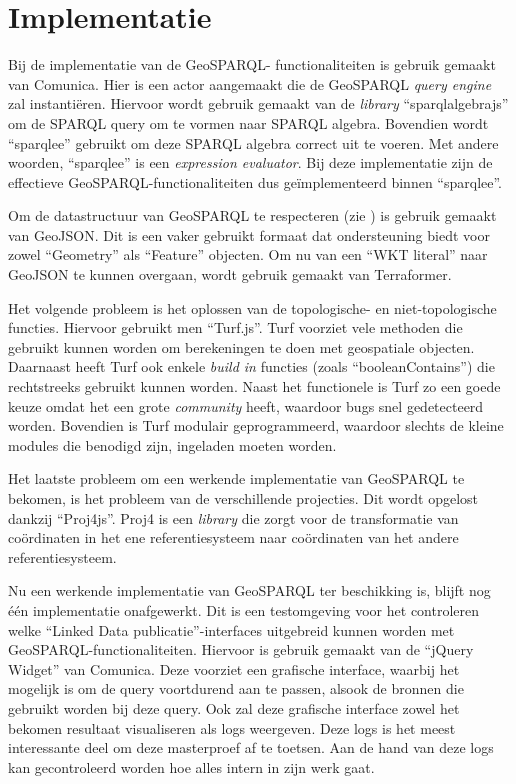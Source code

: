 \documentclass[twocolumn]{phdsymp} %
\begin{document}
\section{Implementatie}
Bij de implementatie van de GeoSPARQL- functionaliteiten is gebruik gemaakt van Comunica. Hier is een actor aangemaakt die de GeoSPARQL \textit{query engine} zal instantiëren. Hiervoor wordt gebruik gemaakt van de \textit{library} ``sparqlalgebrajs'' om de SPARQL query om te vormen naar SPARQL algebra. Bovendien wordt ``sparqlee'' gebruikt om deze SPARQL algebra correct uit te voeren. Met andere woorden, ``sparqlee'' is een \textit{expression evaluator}. Bij deze implementatie zijn de effectieve GeoSPARQL-functionaliteiten dus geïmplementeerd binnen ``sparqlee''. 

Om de datastructuur van GeoSPARQL te respecteren (zie ) is gebruik gemaakt van GeoJSON. Dit is een vaker gebruikt formaat dat ondersteuning biedt voor zowel ``Geometry'' als ``Feature'' objecten. Om nu van een ``WKT literal'' naar GeoJSON te kunnen overgaan, wordt gebruik gemaakt van Terraformer. 

Het volgende probleem is het oplossen van de topologische- en niet-topologische functies. Hiervoor gebruikt men ``Turf.js''. Turf voorziet vele methoden die gebruikt kunnen worden om berekeningen te doen met geospatiale objecten. Daarnaast heeft Turf ook enkele \textit{build in} functies (zoals ``booleanContains'') die rechtstreeks gebruikt kunnen worden. Naast het functionele is Turf zo een goede keuze omdat het een grote \textit{community} heeft, waardoor bugs snel gedetecteerd worden. Bovendien is Turf modulair geprogrammeerd, waardoor slechts de kleine modules die benodigd zijn, ingeladen moeten worden. 

Het laatste probleem om een werkende implementatie van GeoSPARQL te bekomen, is het probleem van de verschillende projecties. Dit wordt opgelost dankzij ``Proj4js''. Proj4 is een \textit{library} die zorgt voor de transformatie van coördinaten in het ene referentiesysteem naar coördinaten van het andere referentiesysteem. 

Nu een werkende implementatie van GeoSPARQL ter beschikking is, blijft nog één implementatie onafgewerkt. Dit is een testomgeving voor het controleren welke ``Linked Data publicatie''-interfaces uitgebreid kunnen worden met GeoSPARQL-functionaliteiten. Hiervoor is gebruik gemaakt van de ``jQuery Widget'' van Comunica. Deze voorziet een grafische interface, waarbij het mogelijk is om de query voortdurend aan te passen, alsook de bronnen die gebruikt worden bij deze query. Ook zal deze grafische interface zowel het bekomen resultaat visualiseren als logs weergeven. Deze logs is het meest interessante deel om deze masterproef af te toetsen. Aan de hand van deze logs kan gecontroleerd worden hoe alles intern in zijn werk gaat. 
\end{document}
